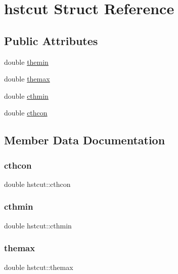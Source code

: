 \hypertarget{structhstcut}{}\section{hstcut Struct Reference}
\label{structhstcut}
\subsection*{Public Attributes}
\begin{DoxyCompactItemize}
\item 
double \hyperlink{structhstcut_ae620b6ff10decc27b732c1b7fd53e13a}{themin}
\item 
double \hyperlink{structhstcut_a135b908e1f42dfe3f138d21257f8de14}{themax}
\item 
double \hyperlink{structhstcut_afbbf3d36b0eeb040c7e470538b8b3c54}{cthmin}
\item 
double \hyperlink{structhstcut_a43b3ea1fd439a6c36041412816928c88}{cthcon}
\end{DoxyCompactItemize}


\subsection{Member Data Documentation}
\mbox{\label{structhstcut_a43b3ea1fd439a6c36041412816928c88}} 
\subsubsection{\texorpdfstring{cthcon}{cthcon}}
{\footnotesize\ttfamily double hstcut\+::cthcon}

\mbox{\label{structhstcut_afbbf3d36b0eeb040c7e470538b8b3c54}} 
\subsubsection{\texorpdfstring{cthmin}{cthmin}}
{\footnotesize\ttfamily double hstcut\+::cthmin}

\mbox{\label{structhstcut_a135b908e1f42dfe3f138d21257f8de14}} 
\subsubsection{\texorpdfstring{themax}{themax}}
{\footnotesize\ttfamily double hstcut\+::themax}

